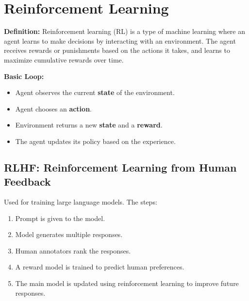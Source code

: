 \section{Reinforcement Learning}

\textbf{Definition:} Reinforcement learning (RL) is a type of machine learning where an agent learns to make decisions by interacting with an environment. The agent receives rewards or punishments based on the actions it takes, and learns to maximize cumulative rewards over time.

\textbf{Basic Loop:}
\begin{itemize}
    \item Agent observes the current \textbf{state} of the environment.
    \item Agent chooses an \textbf{action}.
    \item Environment returns a new \textbf{state} and a \textbf{reward}.
    \item The agent updates its policy based on the experience.
\end{itemize}

\begin{center}
\end{center}

\subsection*{RLHF: Reinforcement Learning from Human Feedback}

Used for training large language models. The steps:

\begin{enumerate}
    \item Prompt is given to the model.
    \item Model generates multiple responses.
    \item Human annotators rank the responses.
    \item A reward model is trained to predict human preferences.
    \item The main model is updated using reinforcement learning to improve future responses.
\end{enumerate}

